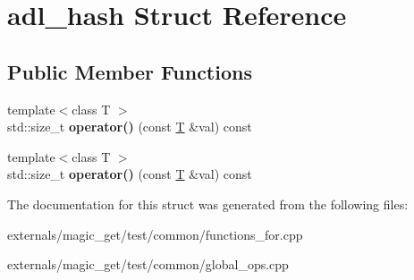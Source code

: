 \hypertarget{structadl__hash}{}\section{adl\+\_\+hash Struct Reference}
\label{structadl__hash}
\subsection*{Public Member Functions}
\begin{DoxyCompactItemize}
\item 
\mbox{\label{structadl__hash_ae95b350a7d361bdca0b1430ed93b610a}} 
{\footnotesize template$<$class T $>$ }\\std\+::size\+\_\+t {\bfseries operator()} (const \mbox{\hyperlink{struct_t}{T}} \&val) const
\item 
\mbox{\label{structadl__hash_ae95b350a7d361bdca0b1430ed93b610a}} 
{\footnotesize template$<$class T $>$ }\\std\+::size\+\_\+t {\bfseries operator()} (const \mbox{\hyperlink{struct_t}{T}} \&val) const
\end{DoxyCompactItemize}


The documentation for this struct was generated from the following files\+:\begin{DoxyCompactItemize}
\item 
externals/magic\+\_\+get/test/common/functions\+\_\+for.\+cpp\item 
externals/magic\+\_\+get/test/common/global\+\_\+ops.\+cpp\end{DoxyCompactItemize}
